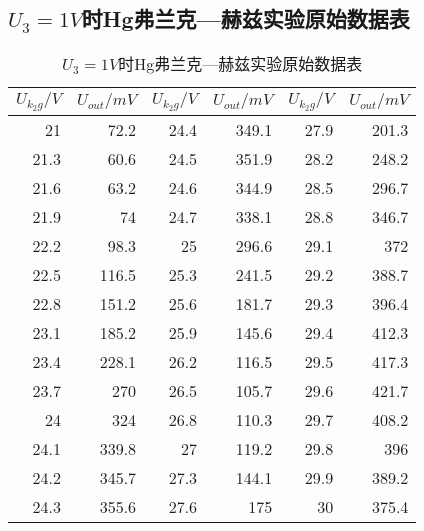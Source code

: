 \documentclass[a4 paper,12pt]{article}
\begin{document}
\subsection{$U_{3}=1V$时Hg弗兰克—赫兹实验原始数据表}
\begin{longtable}{||r|r||r|r||r|r||}
	\caption{$U_{3}=1V$时Hg弗兰克—赫兹实验原始数据表}\\
	\hline
	\hline
	$U_{k_{2}g}/V$&$U_{out}/mV$&	$U_{k_{2}g}/V$&$U_{out}/mV$&	$U_{k_{2}g}/V$&$U_{out}/mV$\\
	\hline
	\hline
		21    & 72.2  & 24.4  & 349.1 & 27.9  & 201.3 \\
		21.3  & 60.6  & 24.5  & 351.9 & 28.2  & 248.2 \\
		21.6  & 63.2  & 24.6  & 344.9 & 28.5  & 296.7 \\
		21.9  & 74    & 24.7  & 338.1 & 28.8  & 346.7 \\
		22.2  & 98.3  & 25    & 296.6 & 29.1  & 372 \\
		22.5  & 116.5 & 25.3  & 241.5 & 29.2  & 388.7 \\
		22.8  & 151.2 & 25.6  & 181.7 & 29.3  & 396.4 \\
		23.1  & 185.2 & 25.9  & 145.6 & 29.4  & 412.3 \\
		23.4  & 228.1 & 26.2  & 116.5 & 29.5  & 417.3 \\
		23.7  & 270   & 26.5  & 105.7 & 29.6  & 421.7 \\
		24    & 324   & 26.8  & 110.3 & 29.7  & 408.2 \\
		24.1  & 339.8 & 27    & 119.2 & 29.8  & 396 \\
		24.2  & 345.7 & 27.3  & 144.1 & 29.9  & 389.2 \\
		24.3  & 355.6 & 27.6  & 175   & 30    & 375.4 \\
		\hline
\end{longtable}
\end{document}
